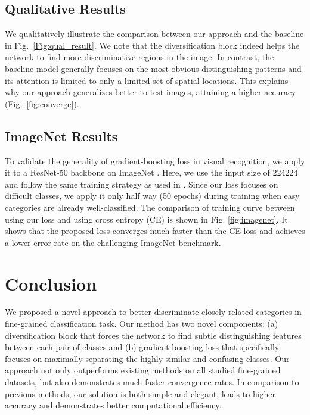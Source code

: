 \documentclass[letterpaper]{article} \usepackage{aaai20}  \usepackage{times}  \usepackage{helvet} \usepackage{courier}  \usepackage[hyphens]{url}  \usepackage{graphicx} \usepackage{multirow}
\begin{document}
\subsection{Qualitative Results}
We qualitatively illustrate the comparison between our approach and the baseline in Fig.~\ref{Fig:qual_result}. We note that the diversification block indeed helps the network to find more discriminative regions in the image. In contrast, the baseline model generally focuses on the most obvious distinguishing patterns and its attention is limited to only a limited set of spatial locations. This explains why our approach generalizes better to test images, attaining a higher accuracy (Fig.~\ref{fig:converge}). 


\subsection{ImageNet Results}
To validate the generality of gradient-boosting loss in visual recognition, we apply it to a ResNet-50 backbone on ImageNet \cite{ILSVRC15}. Here, we use the input size of 224224 and follow the same training strategy as used in \cite{resnet_2016}. Since our loss focuses on difficult classes, we apply it only half way (50 epochs) during training when easy categories are already well-classified. The comparison of training curve between using our loss and using cross entropy (CE) is shown in Fig. \ref{fig:imagenet}. It shows that the proposed loss converges much faster than the CE loss and achieves a lower error rate on the challenging ImageNet benchmark. 

\section{Conclusion}
We proposed a novel approach to better discriminate closely related categories in fine-grained classification task. Our method has two novel components: (a) diversification block that forces the network to find subtle distinguishing features between each pair of classes and (b) gradient-boosting loss that specifically focuses on maximally separating the highly similar and confusing classes. Our approach not only outperforms existing methods on all studied fine-grained datasets, but also demonstrates much faster convergence rates. In comparison to previous methods, our solution is both simple and elegant, leads to higher accuracy and demonstrates better computational efficiency. 



\end{document}
